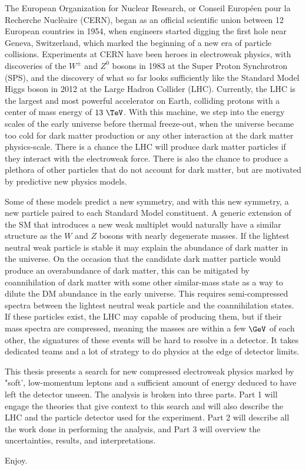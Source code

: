 The European Organization for Nuclear Research, or Conseil Europ\'een pour la Recherche Nucl\`eaire (CERN), began as an official scientific union between 12 European countries in 1954, when engineers started digging the first hole near Geneva, Switzerland, which marked the beginning of a new era of particle collisions.  Experiments at CERN have been heroes in electroweak physics, with discoveries of the $W^\pm$ and $Z^0$ bosons in 1983 at the Super Proton Synchrotron (SPS), and the discovery of what so far looks sufficiently like the Standard Model Higgs boson in 2012 at the Large Hadron Collider (LHC).  Currently, the LHC is the largest and most powerful accelerator on Earth, colliding protons with a center of mass energy of $13~\TeV$.  With this machine, we step into the energy scales of the early universe before thermal freeze-out, when the universe became too cold for dark matter production or any other interaction at the dark matter physics-scale.  There is a chance the LHC will produce dark matter particles if they interact with the electroweak force.  There is also the chance to produce a plethora of other particles that do not account for dark matter, but are motivated by predictive new physics models. 

Some of these models predict a new symmetry, and with this new symmetry, a new particle paired to each Standard Model constituent.  A generic extension of the SM that introduces a new weak multiplet would naturally have a similar structure as the $W$ and $Z$ bosons with nearly degenerate masses.  If the lightest neutral weak particle is stable it may explain the abundance of dark matter in the universe.  On the occasion that the candidate dark matter particle would produce an overabundance of dark matter, this can be mitigated by coannihilation of dark matter with some other similar-mass state as a way to dilute the DM abundance in the early universe.  This requires semi-compressed spectra between the lightest neutral weak particle and the coannihilation states.  If these particles exist, the LHC may capable of producing them, but if their mass spectra are compressed, meaning the masses are within a few $\GeV$ of each other, the signatures of these events will be hard to resolve in a detector.  It takes dedicated teams and a lot of strategy to do physics at the edge of detector limits. 

This thesis presents a search for new compressed electroweak physics marked by "soft', low-momentum leptons and a sufficient amount of energy deduced to have left the detector unseen.  The analysis is broken into three parts.  Part 1 will engage the theories that give context to this search and will also describe the LHC and the particle detector used for the experiment.  Part 2 will describe all the work done in performing the analysis, and Part 3 will overview the uncertainties, results, and interpretations.

Enjoy.







